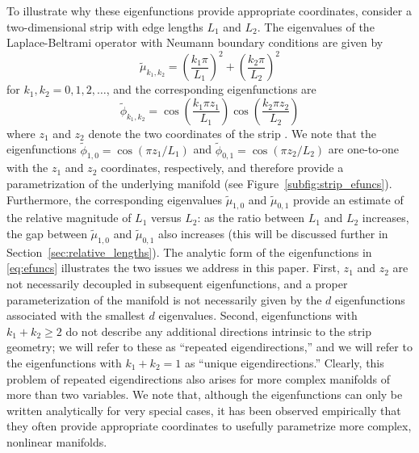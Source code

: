 \documentclass[3p]{elsarticle}
\begin{document}
To illustrate why these eigenfunctions provide appropriate coordinates, consider a two-dimensional strip with edge lengths $L_1$ and $L_2$.
%
The eigenvalues of the Laplace-Beltrami operator with Neumann boundary conditions are given by
\begin{equation} \label{eq:evals}
\tilde{\mu}_{k_1, k_2} = \left( \frac{k_1 \pi}{L_1} \right)^2 + \left( \frac{k_2 \pi}{L_2} \right)^2
\end{equation}
for $k_1, k_2 = 0, 1, 2, \dots$,
and the corresponding eigenfunctions are
\begin{equation} \label{eq:efuncs}
\tilde{\phi}_{k_1, k_2} = \cos \left( \frac{k_1 \pi z_1}{L_1} \right) \cos \left( \frac{k_2 \pi z_2}{L_2} \right)
\end{equation}
where $z_1$ and $z_2$ denote the two coordinates of the strip \cite{singer2008non}.
%
We note that the eigenfunctions $\tilde{\phi}_{1, 0} = \cos \left( {\pi z_1}/{L_1} \right)$ and
$\tilde{\phi}_{0, 1} = \cos \left( {\pi z_2}/{L_2} \right)$ are one-to-one with the $z_1$ and $z_2$ coordinates,
respectively, and therefore provide a parametrization of the underlying manifold (see Figure~\ref{subfig:strip_efuncs}).
%
Furthermore, the corresponding eigenvalues $\tilde{\mu}_{1,0}$ and $\tilde{\mu}_{0,1}$ provide an estimate of the
relative magnitude of $L_1$ versus $L_2$: as the ratio between $L_1$ and $L_2$ increases,
the gap between $\tilde{\mu}_{1,0}$ and $\tilde{\mu}_{0,1}$ also increases
(this will be discussed further in Section~\ref{sec:relative_lengths}).
%
The analytic form of the eigenfunctions in \eqref{eq:efuncs} illustrates the two issues we address in this paper.
%
First, $z_1$ and $z_2$ are not necessarily decoupled in subsequent eigenfunctions,
and a proper parameterization of the manifold is not necessarily given by the $d$ eigenfunctions associated with the
smallest $d$ eigenvalues.
%
Second, eigenfunctions with $k_1+k_2 \ge 2$ do not describe any
additional directions intrinsic to the strip geometry; we will refer to these as ``repeated eigendirections,''
and we will refer to the eigenfunctions with $k_1+k_2 =1$ as ``unique eigendirections.''
%
Clearly, this problem of repeated eigendirections also arises for more complex manifolds of more than two variables.
%
We note that, although the eigenfunctions can only be written analytically for very special cases,
it has been observed empirically that they often provide appropriate coordinates
to usefully parametrize more complex, nonlinear manifolds.
%
\end{document}
